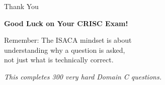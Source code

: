 \documentclass{beamer}
\begin{document}
	\begin{frame}{Thank You}
		\begin{center}
			\Huge
			\textbf{Good Luck on Your CRISC Exam!}
			
			\vspace{1cm}
			
			\normalsize
			Remember: The ISACA mindset is about\\
			understanding why a question is asked,\\
			not just what is technically correct.
			
			\vspace{1cm}
			
			\textit{This completes 300 very hard Domain C questions.}
		\end{center}
	\end{frame}
	
\end{document}

